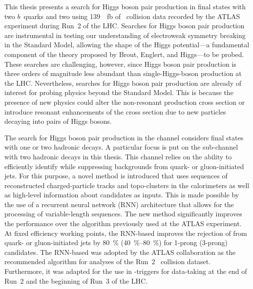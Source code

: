 This thesis presents a search for Higgs boson pair production in final states
with two $b$~quarks and two \tauleptons using \SI{139}{\per\femto\barn} of
\pp~collision data recorded by the ATLAS experiment during Run~2 of the
LHC. Searches for Higgs boson pair production are instrumental in testing our
understanding of electroweak symmetry breaking in the Standard Model, allowing
the shape of the Higgs potential---a fundamental component of the theory
proposed by Brout, Englert, and Higgs---to be probed. These searches are
challenging, however, since Higgs boson pair production is three orders of
magnitude less abundant than single-Higgs-boson production at the
LHC. Nevertheless, searches for Higgs boson pair production are already of
interest for probing physics beyond the Standard Model. This is because the
presence of new physics could alter the non-resonant \HH production cross
section or introduce resonant enhancements of the cross section due to new
particles decaying into pairs of Higgs bosons.


The search for Higgs boson pair production in the \bbtautau channel considers
final states with one or two hadronic \tauleptonC decays. A particular focus is
put on the sub-channel with two hadronic \tauleptonC decays in this thesis. This
channel relies on the ability to efficiently identify \tauhadvis while
suppressing backgrounds from quark- or gluon-initiated jets. For this purpose, a
novel \tauid method is introduced that uses sequences of reconstructed
charged-particle tracks and topo-clusters in the calorimeters as well as
high-level information about \tauhadvis candidates as inputs. This is made
possible by the use of a recurrent neural network (RNN) architecture that allows
for the processing of variable-length sequences. The new method significantly
improves the \tauid performance over the %
algorithm previously used at the ATLAS experiment. At fixed \tauhadvis
efficiency working points, the RNN-based \tauid improves the rejection of
\faketauhadvis from quark- or gluon-initiated jets by \SI{80}{\percent}
(\SIrange[range-units=single]{40}{80}{\percent}) for 1-prong (3-prong)
\tauhadvis candidates.
The RNN-based \tauid was adopted by the ATLAS collaboration as the recommended
\tauid algorithm for analyses of the Run~2 \pp~collision dataset. Furthermore,
it was adapted for the use in \tauhadvis-triggers for data-taking at the end of
Run~2 and the beginning of Run~3 of the LHC.



